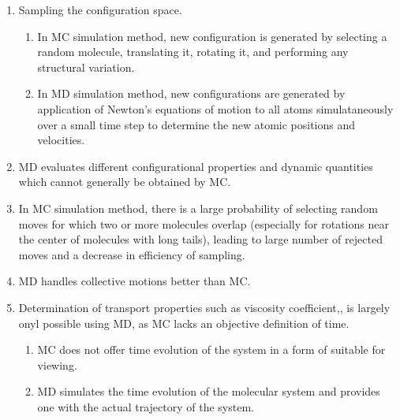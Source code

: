 \documentclass[a4paper,10pt]{paper}
\begin{document}
\begin{enumerate}
	\item Sampling the configuration space.
	\begin{enumerate}
		\item In MC simulation method, new configuration is generated by selecting a random molecule, translating it, rotating it, and performing any structural variation.
		\item In MD simulation method, new configurations are generated by application of Newton's equations of motion to all atoms simulataneously over a small time step
to determine the new atomic positions and velocities.
	\end{enumerate}
	\item MD evaluates different configurational properties and dynamic quantities which cannot generally be obtained by MC. 
	\item In MC simulation method, there is a large probability of selecting random moves for which two or more molecules overlap (especially for rotations near the center of molecules with long tails),
leading to large number of rejected moves and a decrease in efficiency of sampling. 
	\item MD handles collective motions better than MC.
	\item Determination of transport properties such as viscosity coefficient,, is largely onyl possible using MD, as MC lacks an objective definition of time.
	\begin{enumerate}
		\item MC does not offer time evolution of the system in a form of suitable for viewing.
		\item MD simulates the time evolution of the molecular system and provides one with the actual trajectory of the system.
	\end{enumerate}
\end{enumerate}
\end{document}
